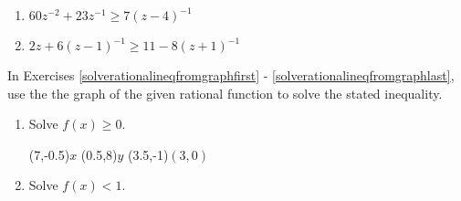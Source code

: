 \documentclass{ximera}
\begin{document}
\begin{multicols}{2}
\begin{enumerate}
\setcounter{enumi}{\value{HW}}

\item $60z^{-2}+23z^{-1} \geq 7(z-4)^{-1}$
\item $2z+6(z-1)^{-1} \geq 11 - 8(z+1)^{-1}$ \label{ratlineqexerciselast}

\setcounter{HW}{\value{enumi}}
\end{enumerate}
\end{multicols}

In Exercises \ref{solverationalineqfromgraphfirst} - \ref{solverationalineqfromgraphlast}, use the the graph of the given rational function to  solve the stated inequality.

\begin{multicols}{2}
\begin{enumerate}
\setcounter{enumi}{\value{HW}}

\item \label{solverationalineqfromgraphfirst} Solve $f(x) \geq 0$.


\begin{mfpic}[10]{-7}{7}{-6}{8}
\dashed {}
\tlabel[cc](7,-0.5){\scriptsize $x$}
\tlabel[cc](0.5,8){\scriptsize $y$}
\tlabel[cc](3.5,-1){\scriptsize $(3,0)$}
\axes
{}
\tiny
\tlpointsep{4pt}
\normalsize
\penwd{1.25pt}
\arrow \reverse \arrow {}
\arrow \reverse \arrow  {}
\end{mfpic}

\vfill

\columnbreak

\item  Solve $f(x) < 1$.



\end{enumerate}
\end{multicols}
\end{document}
